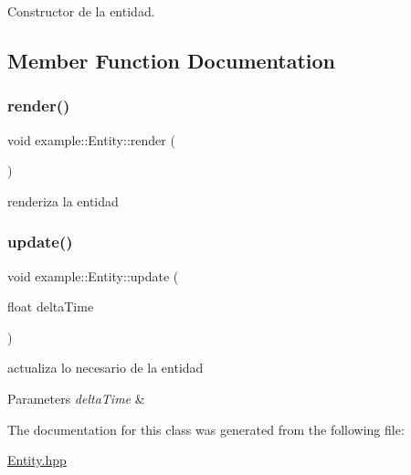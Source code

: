 Constructor de la entidad. 



\subsection{Member Function Documentation}
\mbox{\label{classexample_1_1_entity_a77e00e7676f787a08345c12f4144b2a5}} 
\subsubsection{\texorpdfstring{render()}{render()}}
{\footnotesize\ttfamily void example\+::\+Entity\+::render (\begin{DoxyParamCaption}{ }\end{DoxyParamCaption})}



renderiza la entidad 

\mbox{\label{classexample_1_1_entity_a44bb0b33997980cdb895500e53e1ce6a}} 
\subsubsection{\texorpdfstring{update()}{update()}}
{\footnotesize\ttfamily void example\+::\+Entity\+::update (\begin{DoxyParamCaption}\item[{float}]{delta\+Time }\end{DoxyParamCaption})}



actualiza lo necesario de la entidad 


\begin{DoxyParams}{Parameters}
{\em delta\+Time} & \\
\hline
\end{DoxyParams}


The documentation for this class was generated from the following file\+:\begin{DoxyCompactItemize}
\item 
\mbox{\hyperlink{_entity_8hpp}{Entity.\+hpp}}\end{DoxyCompactItemize}
